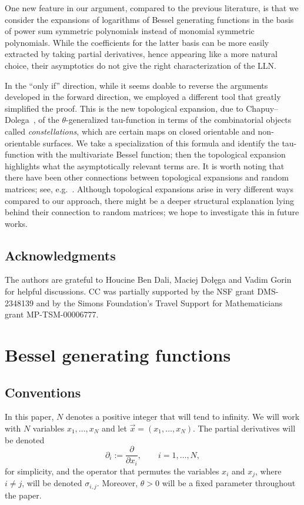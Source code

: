 \documentclass[11pt]{article}
\theoremstyle{plain}
\begin{document}
One new feature in our argument, compared to the previous literature, is that we consider the expansions of logarithms of Bessel generating functions in the basis of power sum symmetric polynomials instead of monomial symmetric polynomials.
While the coefficients for the latter basis can be more easily extracted by taking partial derivatives, hence appearing like a more natural choice, their asymptotics do not give the right characterization of the LLN. 

In the ``only if'' direction, while it seems doable to reverse the arguments developed in the forward direction, we employed a different tool that greatly simplified the proof.
This is the new topological expansion, due to Chapuy--Dolega~\cite{CD}, of the $\theta$-generalized tau-function in terms of the combinatorial objects called \emph{constellations}, which are certain maps on closed orientable and non-orientable surfaces.
We take a specialization of this formula and identify the tau-function with the multivariate Bessel function; then the topological expansion highlights what the asymptotically relevant terms are.
It is worth noting that there have been other connections between topological expansions and random matrices; see, e.g.~\cite{BG13,CE06,BoGF}.
Although topological expansions arise in very different ways compared to our approach, there might be a deeper structural explanation lying behind their connection to random matrices; we hope to investigate this in future works.



\subsection*{Acknowledgments}


The authors are grateful to Houcine Ben Dali,  Maciej Do\l{}\k{e}ga and Vadim Gorin for helpful discussions.
CC was partially supported by the NSF grant DMS-2348139 and by the Simons Foundation’s Travel Support for Mathematicians grant MP-TSM-00006777.


\section{Bessel generating functions}


\subsection{Conventions}

In this paper, $N$ denotes a positive integer that will tend to infinity.
We will work with $N$ variables $x_1,\dots,x_N$ and let $\vec{x}=(x_1,\dots,x_N)$.
The partial derivatives will be denoted
\[
\partial_i := \frac{\partial}{\partial x_i},\qquad i=1,\dots,N,
\]
for simplicity, and the operator that permutes the variables $x_i$ and $x_j$, where $i\ne j$, will be denoted $\sigma_{i,j}$.
Moreover, $\theta>0$ will be a fixed parameter throughout the paper.
\end{document}
